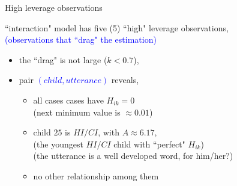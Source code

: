 %
%
\begin{lhframe}[rhgraphic={\texttt{[image: outliers.pdf]}}]
	{High leverage observations}
	
	``interaction" model has five (5) ``high" leverage observations, \\
	{\small \textcolor{blue}{(observations that ``drag" the estimation)} }
	\begin{itemize}
		\item the ``drag" is not large ($k<0.7$),
		\item pair \textcolor{blue}{$(child, utterance)$} reveals,
		\begin{itemize}
			\item all cases cases have $H_{ik}=0$ \\
			{\small (next minimum value is $\approx 0.01$)}
			\item child $25$ is $HI/CI$, with $A \approx 6.17$, \\
			{\small (the youngest $HI/CI$ child with ``perfect" $H_{ik}$)} \\
			{\small (the utterance is a well developed word, for him/her?)}
			\item no other relationship among them
		\end{itemize}
	\end{itemize}
\end{lhframe}
%
%
